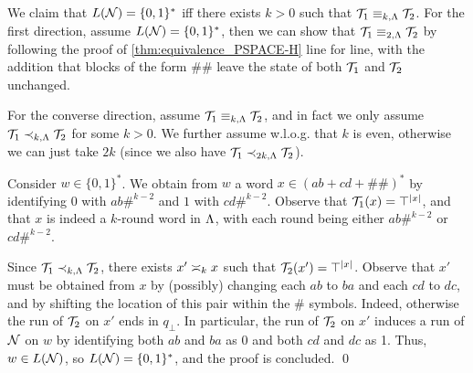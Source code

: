 We claim that $L(\cN)=\{0,1\}^*$ iff there exists $k>0$ such that $\cT_1\equiv_{k,\fL}\cT_2$.
For the first direction, assume $L(\cN)=\{0,1\}^*$, then we can show that $\cT_1\equiv_{2,\fL}\cT_2$ by following the proof of \autoref{thm:equivalence_PSPACE-H} line for line, with the addition that blocks of the form $\#\#$ leave the state of both $\cT_1$ and $\cT_2$ unchanged.

For the converse direction, assume $\cT_1\equiv_{k,\fL}\cT_2$, and in fact we only assume $\cT_1\prec_{k,\fL}\cT_2$ for some $k>0$. We further assume w.l.o.g. that $k$ is even, otherwise we can just take $2k$ (since we also have $\cT_1\prec_{2k,\fL}\cT_2$).

Consider $w\in \{0,1\}^*$. We obtain from $w$ a word $x\in (ab+cd+\#\#)^*$ by identifying $0$ with $ab\#^{k-2}$ and $1$ with $cd\#^{k-2}$. Observe that $\cT_1(x)=\top^{|x|}$, and that $x$ is indeed a $k$-round word in $\fL$, with each round being either $ab\#^{k-2}$ or $cd\#^{k-2}$. 

Since $\cT_1\prec_{k,\fL}\cT_2$, there exists $x'\req[k]x$ such that $\cT_2(x')=\top^{|x|}$. Observe that $x'$ must be obtained from $x$ by (possibly) changing each $ab$ to $ba$ and each $cd$ to $dc$, and by shifting the location of this pair within the $\#$ symbols. Indeed, otherwise the run of $\cT_2$ on $x'$ ends in $q_{\bot}$.
In particular, the run of $\cT_2$ on $x'$ induces a run of $\cN$ on $w$ by identifying both $ab$ and $ba$ as 0 and both $cd$ and $dc$ as 1. Thus, $w\in L(\cN)$, so $L(\cN)=\{0,1\}^*$, and the proof is concluded. \qed






